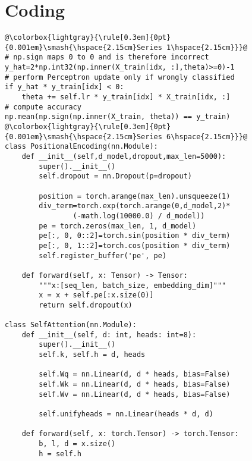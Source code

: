 
\section{Coding}
\lstset{frame=single, basicstyle=\ttfamily, aboveskip=0pt, escapechar=@, belowskip=0pt}
\begin{lstlisting}[style=mypython]
@\colorbox{lightgray}{\rule[0.3em]{0pt}{0.001em}\smash{\hspace{2.15cm}Series 1\hspace{2.15cm}}}@
# np.sign maps 0 to 0 and is therefore incorrect
y_hat=2*np.int32(np.inner(X_train[idx, :],theta)>=0)-1
# perform Perceptron update only if wrongly classified
if y_hat * y_train[idx] < 0:
    theta += self.lr * y_train[idx] * X_train[idx, :]
# compute accuracy
np.mean(np.sign(np.inner(X_train, theta)) == y_train)
@\colorbox{lightgray}{\rule[0.3em]{0pt}{0.001em}\smash{\hspace{2.15cm}Series 6\hspace{2.15cm}}}@
class PositionalEncoding(nn.Module):
    def __init__(self,d_model,dropout,max_len=5000):
        super().__init__()
        self.dropout = nn.Dropout(p=dropout)

        position = torch.arange(max_len).unsqueeze(1)
        div_term=torch.exp(torch.arange(0,d_model,2)* 
                (-math.log(10000.0) / d_model))
        pe = torch.zeros(max_len, 1, d_model)
        pe[:, 0, 0::2]=torch.sin(position * div_term)
        pe[:, 0, 1::2]=torch.cos(position * div_term)
        self.register_buffer('pe', pe)

    def forward(self, x: Tensor) -> Tensor:
        """x:[seq_len, batch_size, embedding_dim]"""
        x = x + self.pe[:x.size(0)]
        return self.dropout(x)
        
class SelfAttention(nn.Module):
    def __init__(self, d: int, heads: int=8):
        super().__init__()
        self.k, self.h = d, heads

        self.Wq = nn.Linear(d, d * heads, bias=False)
        self.Wk = nn.Linear(d, d * heads, bias=False)
        self.Wv = nn.Linear(d, d * heads, bias=False)

        self.unifyheads = nn.Linear(heads * d, d)

    def forward(self, x: torch.Tensor) -> torch.Tensor:
        b, l, d = x.size()
        h = self.h


\end{lstlisting}
